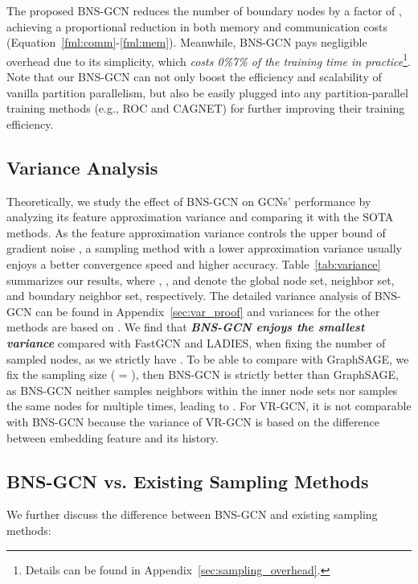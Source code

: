 \documentclass{article}
\begin{document}
The proposed BNS-GCN reduces the number of boundary nodes by a factor of , 
achieving a proportional reduction in both memory and communication costs (Equation~\ref{fml:comm}-\ref{fml:mem}).
Meanwhile, BNS-GCN pays negligible overhead due to its simplicity, which \textit{costs 0\%7\% of the training time in practice}\footnote{Details can be found in Appendix~\ref{sec:sampling_overhead}.}.
Note that our BNS-GCN can not only boost the efficiency and scalability of vanilla partition parallelism, but also be easily plugged into any partition-parallel training methods (e.g., ROC and CAGNET) for further improving their training efficiency.

\subsection{Variance Analysis}
\label{sec:BNS-theory}
Theoretically, we study the effect of BNS-GCN on GCNs' performance by analyzing its feature approximation variance and comparing it with the SOTA methods. 
As the feature approximation variance controls the upper bound of gradient noise \citep{cong2020minimal}, a sampling method with a lower approximation variance usually enjoys a better convergence speed \citep{gower2019sgd} and higher accuracy.
Table~\ref{tab:variance} summarizes our results,  
where , , and  denote the global node set, neighbor set, and boundary neighbor set, respectively.
The detailed variance analysis of BNS-GCN can be found in Appendix~\ref{sec:var_proof} and variances for the other methods are based on \citep{zou2019layer}.
We find that \textit{\textbf{BNS-GCN enjoys the smallest variance}} compared with FastGCN and LADIES, when fixing the number of sampled nodes, as we strictly have .
To be able to compare with GraphSAGE, we fix the sampling size ( = ), 
then BNS-GCN is strictly better than GraphSAGE, as BNS-GCN neither samples neighbors within the inner node sets nor samples the same nodes for multiple times, leading to .  
For VR-GCN, it is not comparable with BNS-GCN because the variance of VR-GCN is based on the difference between embedding feature and its history.


\subsection{BNS-GCN vs. Existing Sampling Methods}
\label{sec:BNS-Discuss}
We further discuss the difference between
BNS-GCN and existing sampling methods:
\end{document}
